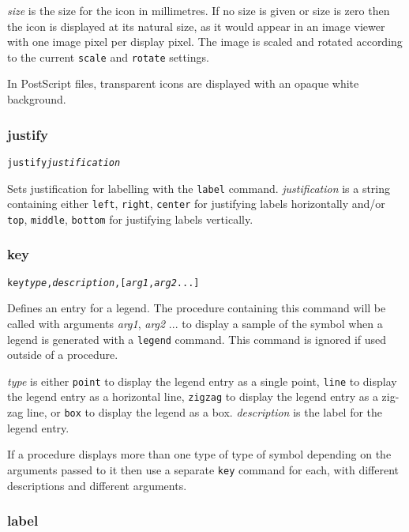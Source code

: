 \textit{size} is the size for the icon in millimetres.  If no size
is given or size is zero then the icon is displayed at its natural size,
as it would appear in an image viewer with one image pixel per display
pixel.
The image is scaled and rotated according to the current \texttt{scale}
and \texttt{rotate} settings.

In PostScript files, transparent icons are displayed with an opaque
white background.

\subsubsection{justify}

\begin{alltt}
justify \textit{justification}
\end{alltt}

Sets justification for labelling with the \texttt{label} command.
\textit{justification} is a string containing either
\texttt{left}, \texttt{right}, \texttt{center} for justifying labels
horizontally and/or
\texttt{top}, \texttt{middle}, \texttt{bottom} for justifying labels
vertically.

\subsubsection{key}

\begin{alltt}
key \textit{type}, \textit{description}, [\textit{arg1}, \textit{arg2} ...]
\end{alltt}

Defines an entry for a legend.  The procedure containing this command will be
called with arguments \textit{arg1}, \textit{arg2} ... to display a sample of
the symbol when a legend is generated with a \texttt{legend} command.  This
command is ignored if used outside of a procedure.

\textit{type} is either
\texttt{point} to display the legend entry as a single point,
\texttt{line} to display the legend entry as a horizontal line,
\texttt{zigzag} to display the legend entry as a zig-zag line,
or
\texttt{box} to display the legend as a box.
\textit{description} is the label for the legend entry.

If a procedure displays more than one type of type of symbol depending
on the arguments passed to it then use a separate
\texttt{key} command for each, with different descriptions
and different arguments.

\subsubsection{label}

